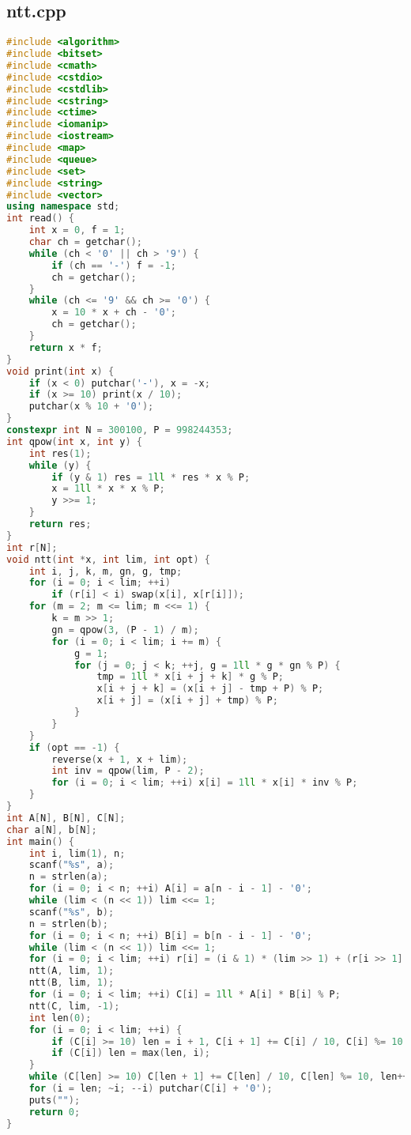 \documentclass[9pt, a4paper, oneside]{book}
\begin{document}
\subsection{ntt.cpp}
\begin{lstlisting}[language={C++}]
#include <algorithm>
#include <bitset>
#include <cmath>
#include <cstdio>
#include <cstdlib>
#include <cstring>
#include <ctime>
#include <iomanip>
#include <iostream>
#include <map>
#include <queue>
#include <set>
#include <string>
#include <vector>
using namespace std;
int read() {
    int x = 0, f = 1;
    char ch = getchar();
    while (ch < '0' || ch > '9') {
        if (ch == '-') f = -1;
        ch = getchar();
    }
    while (ch <= '9' && ch >= '0') {
        x = 10 * x + ch - '0';
        ch = getchar();
    }
    return x * f;
}
void print(int x) {
    if (x < 0) putchar('-'), x = -x;
    if (x >= 10) print(x / 10);
    putchar(x % 10 + '0');
}
constexpr int N = 300100, P = 998244353;
int qpow(int x, int y) {
    int res(1);
    while (y) {
        if (y & 1) res = 1ll * res * x % P;
        x = 1ll * x * x % P;
        y >>= 1;
    }
    return res;
}
int r[N];
void ntt(int *x, int lim, int opt) {
    int i, j, k, m, gn, g, tmp;
    for (i = 0; i < lim; ++i)
        if (r[i] < i) swap(x[i], x[r[i]]);
    for (m = 2; m <= lim; m <<= 1) {
        k = m >> 1;
        gn = qpow(3, (P - 1) / m);
        for (i = 0; i < lim; i += m) {
            g = 1;
            for (j = 0; j < k; ++j, g = 1ll * g * gn % P) {
                tmp = 1ll * x[i + j + k] * g % P;
                x[i + j + k] = (x[i + j] - tmp + P) % P;
                x[i + j] = (x[i + j] + tmp) % P;
            }
        }
    }
    if (opt == -1) {
        reverse(x + 1, x + lim);
        int inv = qpow(lim, P - 2);
        for (i = 0; i < lim; ++i) x[i] = 1ll * x[i] * inv % P;
    }
}
int A[N], B[N], C[N];
char a[N], b[N];
int main() {
    int i, lim(1), n;
    scanf("%s", a);
    n = strlen(a);
    for (i = 0; i < n; ++i) A[i] = a[n - i - 1] - '0';
    while (lim < (n << 1)) lim <<= 1;
    scanf("%s", b);
    n = strlen(b);
    for (i = 0; i < n; ++i) B[i] = b[n - i - 1] - '0';
    while (lim < (n << 1)) lim <<= 1;
    for (i = 0; i < lim; ++i) r[i] = (i & 1) * (lim >> 1) + (r[i >> 1] >> 1);
    ntt(A, lim, 1);
    ntt(B, lim, 1);
    for (i = 0; i < lim; ++i) C[i] = 1ll * A[i] * B[i] % P;
    ntt(C, lim, -1);
    int len(0);
    for (i = 0; i < lim; ++i) {
        if (C[i] >= 10) len = i + 1, C[i + 1] += C[i] / 10, C[i] %= 10;
        if (C[i]) len = max(len, i);
    }
    while (C[len] >= 10) C[len + 1] += C[len] / 10, C[len] %= 10, len++;
    for (i = len; ~i; --i) putchar(C[i] + '0');
    puts("");
    return 0;
}\end{lstlisting}
\end{document}

